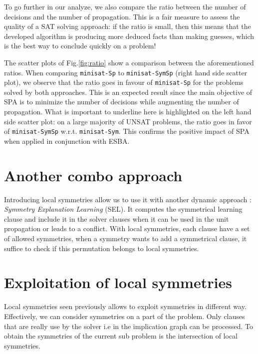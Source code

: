 To go further in our analyze, we also compare the ratio between the number of
decisions and the number of propagation. This is a fair measure to assess the
quality of a SAT solving approach: if the ratio is small, then this means that
the developed algorithm is producing more deduced facts than making guesses,
which is the best way to conclude quickly on a problem!

The scatter plots of Fig.\ref{fig:ratio} show a comparison between the
aforementioned ratios. When comparing \texttt{minisat-Sp} to
\texttt{minisat-SymSp} (right hand side scatter plot), we observe that the
ratio goes in favour of \texttt{minisat-Sp} for the problems solved by both
approaches. This is an expected result since the main objective of SPA is to
minimize the number of decisions while augmenting the number of propagation.
What is important to underline here is highlighted on the left hand side
scatter plot: on a large majority of UNSAT problems, the ratio goes in favor
of \texttt{minisat-SymSp} w.r.t. \texttt{minisat-Sym}. This confirms the
positive impact of SPA when applied in conjunction with ESBA.



\section{Another combo approach}

Introducing local symmetries allow us to use it with another dynamic approach : 
\textit{Symmetry Explanation Learning} (SEL). It computes the symmetrical learning clause and
include it in the solver clauses when it can be used in the unit propagation or leads to a conflict.
With local symmetries, each clause have a set of allowed symmetries, when a symmetry wants to 
add a symmetrical clause, it suffice to check if this permutation belongs to local symmetries.


 

\section{Exploitation of local symmetries}


Local symmetries seen previously allows to exploit symmetries in different way.
Effectively, we can consider symmetries on a part of the problem. Only clauses that are really use
by the solver i.e in the implication graph can be processed.
To obtain the symmetries of the current sub problem is the intersection of local symmetries.
